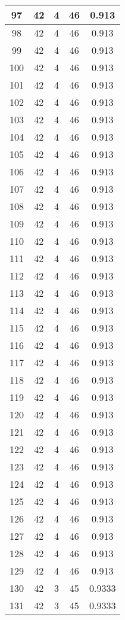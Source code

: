 \documentclass[letterpaper, 12pt]{article}
\begin{document}
\begin{longtable}{|c|c|c|c|c|}
\hline
97 & 42 & 4 & 46 & 0.913 \\
\hline
98 & 42 & 4 & 46 & 0.913 \\
\hline
99 & 42 & 4 & 46 & 0.913 \\
\hline
100 & 42 & 4 & 46 & 0.913 \\
\hline
101 & 42 & 4 & 46 & 0.913 \\
\hline
102 & 42 & 4 & 46 & 0.913 \\
\hline
103 & 42 & 4 & 46 & 0.913 \\
\hline
104 & 42 & 4 & 46 & 0.913 \\
\hline
105 & 42 & 4 & 46 & 0.913 \\
\hline
106 & 42 & 4 & 46 & 0.913 \\
\hline
107 & 42 & 4 & 46 & 0.913 \\
\hline
108 & 42 & 4 & 46 & 0.913 \\
\hline
109 & 42 & 4 & 46 & 0.913 \\
\hline
110 & 42 & 4 & 46 & 0.913 \\
\hline
111 & 42 & 4 & 46 & 0.913 \\
\hline
112 & 42 & 4 & 46 & 0.913 \\
\hline
113 & 42 & 4 & 46 & 0.913 \\
\hline
114 & 42 & 4 & 46 & 0.913 \\
\hline
115 & 42 & 4 & 46 & 0.913 \\
\hline
116 & 42 & 4 & 46 & 0.913 \\
\hline
117 & 42 & 4 & 46 & 0.913 \\
\hline
118 & 42 & 4 & 46 & 0.913 \\
\hline
119 & 42 & 4 & 46 & 0.913 \\
\hline
120 & 42 & 4 & 46 & 0.913 \\
\hline
121 & 42 & 4 & 46 & 0.913 \\
\hline
122 & 42 & 4 & 46 & 0.913 \\
\hline
123 & 42 & 4 & 46 & 0.913 \\
\hline
124 & 42 & 4 & 46 & 0.913 \\
\hline
125 & 42 & 4 & 46 & 0.913 \\
\hline
126 & 42 & 4 & 46 & 0.913 \\
\hline
127 & 42 & 4 & 46 & 0.913 \\
\hline
128 & 42 & 4 & 46 & 0.913 \\
\hline
129 & 42 & 4 & 46 & 0.913 \\
\hline
130 & 42 & 3 & 45 & 0.9333 \\
\hline
131 & 42 & 3 & 45 & 0.9333 \\

\end{longtable}
\end{document}
